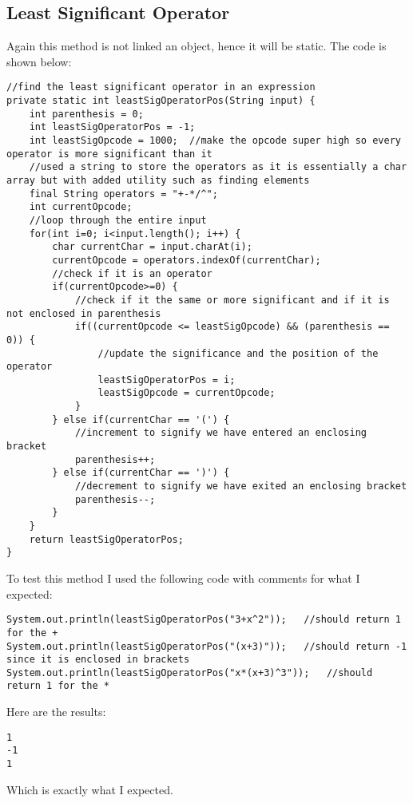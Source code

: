 \documentclass[../../../../main.tex]{subfiles}
\begin{document}
\subsection{Least Significant Operator}
Again this method is not linked an object, hence it will be static. The code is shown below:
\begin{verbatim}
//find the least significant operator in an expression
private static int leastSigOperatorPos(String input) {
	int parenthesis = 0;
	int leastSigOperatorPos = -1;
	int leastSigOpcode = 1000;	//make the opcode super high so every operator is more significant than it
	//used a string to store the operators as it is essentially a char array but with added utility such as finding elements
	final String operators = "+-*/^";
	int currentOpcode;
	//loop through the entire input
	for(int i=0; i<input.length(); i++) {
		char currentChar = input.charAt(i);
		currentOpcode = operators.indexOf(currentChar);
		//check if it is an operator
		if(currentOpcode>=0) {
			//check if it the same or more significant and if it is not enclosed in parenthesis
			if((currentOpcode <= leastSigOpcode) && (parenthesis == 0)) {
				//update the significance and the position of the operator
				leastSigOperatorPos = i;
				leastSigOpcode = currentOpcode;
			}
		} else if(currentChar == '(') {
			//increment to signify we have entered an enclosing bracket
			parenthesis++;
		} else if(currentChar == ')') {
			//decrement to signify we have exited an enclosing bracket
			parenthesis--;
		}
	}
	return leastSigOperatorPos;
}
\end{verbatim}
To test this method I used the following code with comments for what I expected:
\begin{verbatim}
System.out.println(leastSigOperatorPos("3+x^2"));	//should return 1 for the +
System.out.println(leastSigOperatorPos("(x+3)"));	//should return -1 since it is enclosed in brackets
System.out.println(leastSigOperatorPos("x*(x+3)^3"));	//should return 1 for the *
\end{verbatim}
Here are the results:
\begin{verbatim}
1
-1
1
\end{verbatim}
Which is exactly what I expected.
\newpage
\end{document}
